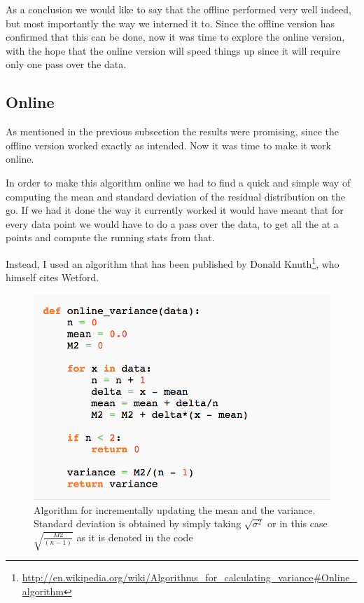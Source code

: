 \documentclass[minf,twoside,singlespacing,parskip,notimes,deptreport]{infthesis} %
\begin{document}
As a conclusion we would like to say that the offline performed very well indeed, but most importantly the way we interned it to. Since the offline version has confirmed that this can be done, now it was time to explore the online version, with the hope that the online version will speed things up since it will require only one pass over the data. 


\subsection{Online}

As mentioned in the previous subsection the results were promising, since the offline version worked exactly as intended. 
Now it was time to make it work online. 

In order to make this algorithm online we had to find a quick and simple way of computing the mean and standard deviation of the residual distribution on the go.  If we had it done the way it currently worked it would have meant that for every data point we would have to do a pass over the data, to get all the at a points and compute the running stats from that. 

Instead, I used an algorithm that has been published by Donald Knuth\footnote{\url{http://en.wikipedia.org/wiki/Algorithms\_for\_calculating\_variance#Online\_algorithm}}, who himself cites Wetford\cite{online-mean-and-var}. 



\begin{figure}[h!]
\begin{center}
\includegraphics[width=\textwidth]{online_algo}
\end{center}
\caption{Algorithm for incrementally updating the mean and the variance. Standard deviation is obtained by simply taking $\sqrt{\sigma^2}$ or in this case $\sqrt{\frac{M2}{(n-1)}}$ as it is denoted in the code}
\label{mean-formula}
\end{figure}
\end{document}
